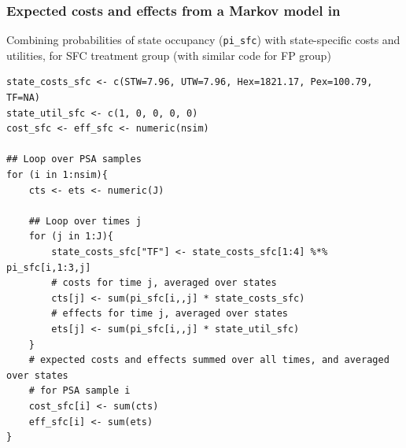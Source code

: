 \begin{frame}[fragile]

\frametitle{Expected costs and effects from a Markov model in \R}

Combining probabilities of state occupancy (\texttt{pi\_sfc}) with state-specific costs and utilities, for SFC treatment group (with similar code for FP group)

{\footnotesize \olive
\begin{verbatim}
state_costs_sfc <- c(STW=7.96, UTW=7.96, Hex=1821.17, Pex=100.79, TF=NA)
state_util_sfc <- c(1, 0, 0, 0, 0)
cost_sfc <- eff_sfc <- numeric(nsim)

## Loop over PSA samples
for (i in 1:nsim){
    cts <- ets <- numeric(J)

    ## Loop over times j
    for (j in 1:J){
        state_costs_sfc["TF"] <- state_costs_sfc[1:4] %*% pi_sfc[i,1:3,j]
        # costs for time j, averaged over states
        cts[j] <- sum(pi_sfc[i,,j] * state_costs_sfc) 
        # effects for time j, averaged over states
        ets[j] <- sum(pi_sfc[i,,j] * state_util_sfc)  
    }
    # expected costs and effects summed over all times, and averaged over states
    # for PSA sample i
    cost_sfc[i] <- sum(cts) 
    eff_sfc[i] <- sum(ets) 
}
\end{verbatim}
}



\end{frame}


